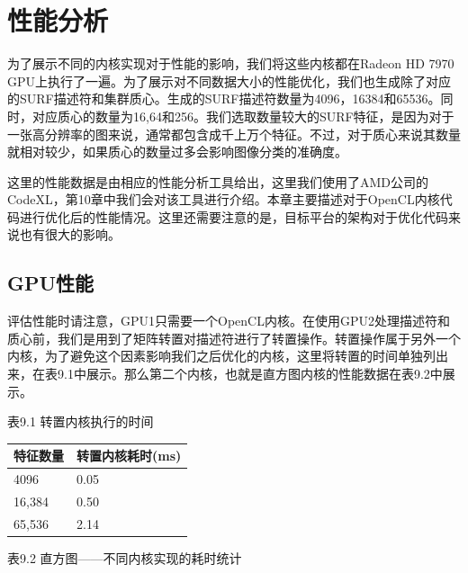 \section{性能分析}

为了展示不同的内核实现对于性能的影响，我们将这些内核都在Radeon HD 7970 GPU上执行了一遍。为了展示对不同数据大小的性能优化，我们也生成除了对应的SURF描述符和集群质心。生成的SURF描述符数量为4096，16384和65536。同时，对应质心的数量为16,64和256。我们选取数量较大的SURF特征，是因为对于一张高分辨率的图来说，通常都包含成千上万个特征。不过，对于质心来说其数量就相对较少，如果质心的数量过多会影响图像分类的准确度。

这里的性能数据是由相应的性能分析工具给出，这里我们使用了AMD公司的CodeXL，第10章中我们会对该工具进行介绍。本章主要描述对于OpenCL内核代码进行优化后的性能情况。这里还需要注意的是，目标平台的架构对于优化代码来说也有很大的影响。

\subsection{GPU性能}

评估性能时请注意，GPU1只需要一个OpenCL内核。在使用GPU2处理描述符和质心前，我们是用到了矩阵转置对描述符进行了转置操作。转置操作属于另外一个内核，为了避免这个因素影响我们之后优化的内核，这里将转置的时间单独列出来，在表9.1中展示。那么第二个内核，也就是直方图内核的性能数据在表9.2中展示。

表9.1 转置内核执行的时间

\par\medskip\noindent
\begingroup\fontsize{9bp}{12.5bp}\selectfont\renewcommand{\arraystretch}{1.12}
\begin{center}
\begin{tabular}{ll}
\toprule
特征数量 & 转置内核耗时(ms) \\
\midrule
4096 & 0.05 \\
16,384 & 0.50 \\
65,536 & 2.14 \\
\bottomrule
\end{tabular}
\end{center}
\endgroup
\medskip

表9.2 直方图——不同内核实现的耗时统计

